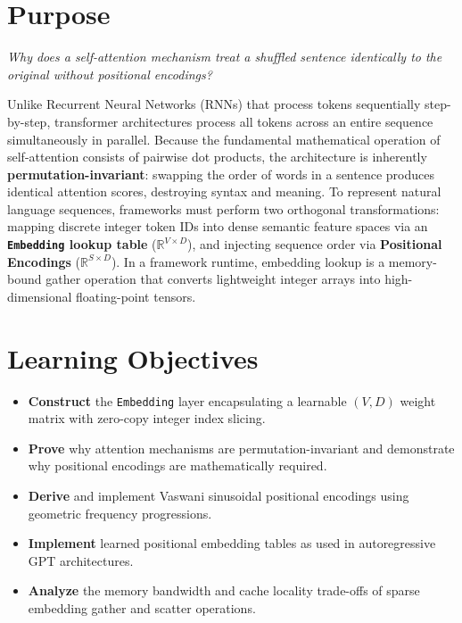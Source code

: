 \documentclass[
  letterpaper,
]{scrbook}
\providecommand{\tightlist}{%
  \setlength{\itemsep}{0pt}\setlength{\parskip}{0pt}}
\begin{document}
\section*{Purpose}\label{purpose-12}


\emph{Why does a self-attention mechanism treat a shuffled sentence
identically to the original without positional encodings?}

Unlike Recurrent Neural Networks (RNNs) that process tokens sequentially
step-by-step, transformer architectures process all tokens across an
entire sequence simultaneously in parallel. Because the fundamental
mathematical operation of self-attention consists of pairwise dot
products, the architecture is inherently \textbf{permutation-invariant}:
swapping the order of words in a sentence produces identical attention
scores, destroying syntax and meaning. To represent natural language
sequences, frameworks must perform two orthogonal transformations:
mapping discrete integer token IDs into dense semantic feature spaces
via an \textbf{\texttt{Embedding} lookup table}
(\(\mathbb{R}^{V \times D}\)), and injecting sequence order via
\textbf{Positional Encodings} (\(\mathbb{R}^{S \times D}\)). In a
framework runtime, embedding lookup is a memory-bound gather operation
that converts lightweight integer arrays into high-dimensional
floating-point tensors.

\section{Learning Objectives}\label{learning-objectives-11}

\begin{itemize}
\tightlist
\item
  \textbf{Construct} the \texttt{Embedding} layer encapsulating a
  learnable \((V, D)\) weight matrix with zero-copy integer index
  slicing.
\item
  \textbf{Prove} why attention mechanisms are permutation-invariant and
  demonstrate why positional encodings are mathematically required.
\item
  \textbf{Derive} and implement Vaswani sinusoidal positional encodings
  using geometric frequency progressions.
\item
  \textbf{Implement} learned positional embedding tables as used in
  autoregressive GPT architectures.
\item
  \textbf{Analyze} the memory bandwidth and cache locality trade-offs of
  sparse embedding gather and scatter operations.
\end{itemize}
\end{document}
